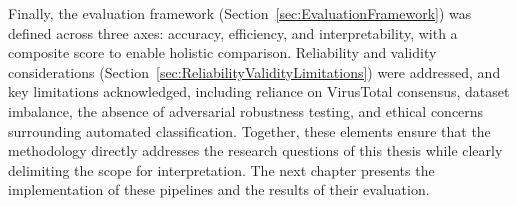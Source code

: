 Finally, the evaluation framework (Section~\ref{sec:EvaluationFramework}) was defined across three
axes: accuracy, efficiency, and interpretability, with a composite score to enable holistic
comparison. Reliability and validity considerations
(Section~\ref{sec:ReliabilityValidityLimitations}) were addressed, and key limitations
acknowledged, including reliance on VirusTotal consensus, dataset imbalance, the absence of
adversarial robustness testing, and ethical concerns surrounding automated classification.
Together, these elements ensure that the methodology directly addresses the research questions of
this thesis while clearly delimiting the scope for interpretation. The next chapter presents the
implementation of these pipelines and the results of their evaluation.
